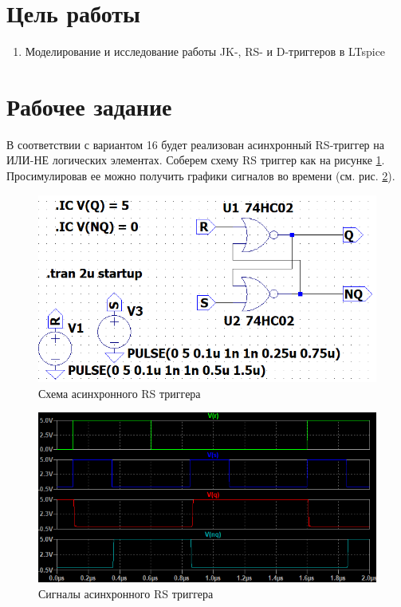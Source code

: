 \section*{Цель работы}

\begin{enumerate}
    \item Моделирование и исследование работы JK-, RS- и D-триггеров в LTspice
\end{enumerate}


\section*{Рабочее задание}

В соответствии с вариантом 16 будет реализован асинхронный RS-триггер на ИЛИ-НЕ
логических элементах. Соберем схему RS триггер как на рисунке \ref{fig:rsff_scheme}.
Просимулировав ее можно получить графики сигналов во времени (см. рис. \ref{fig:rsff_signals}).



\begin{figure}[H]
    \centering
    \includegraphics[width=\textwidth]{figs/RSFF_scheme.png}
    \caption{Схема асинхронного RS триггера}
    \label{fig:rsff_scheme}
\end{figure}

\begin{figure}[H]
    \centering
    \includegraphics[width=\textwidth]{figs/RSFF_signals.png}
    \caption{Сигналы асинхронного RS триггера}
    \label{fig:rsff_signals}
\end{figure}


